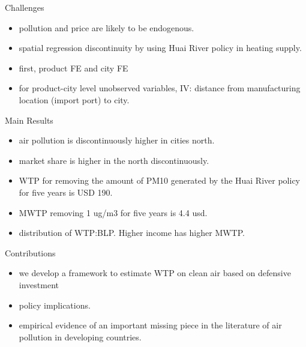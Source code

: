 \documentclass[10pt]{beamer}
\begin{document}
\begin{frame}{Challenges}
    \begin{itemize}
        \item pollution and price are likely to be endogenous.
        \item spatial regression discontinuity by using Huai River policy in heating supply.
        \item first, product FE and city FE
        \item for product-city level unobserved variables, IV: distance from manufacturing location (import port) to city.
    \end{itemize}
\end{frame}
\begin{frame}{Main Results}
    \begin{itemize}
        \item air pollution is discontinuously higher in cities north.
        \item market share is higher in the north discontinuously.
        \item WTP for removing the amount of PM10 generated by the Huai River policy for five years is USD 190.
        \item MWTP removing 1 ug/m3 for five years is 4.4 usd.
        \item distribution of WTP:BLP. Higher income has higher MWTP.
    \end{itemize}
\end{frame}

\begin{frame}{Contributions}
    \begin{itemize}
        \item we develop a framework to estimate WTP on clean air based on defensive investment
        \item policy implications.
        \item empirical evidence of an important missing piece in the literature of air pollution in developing countries.
    \end{itemize}
\end{frame}
\end{document}
